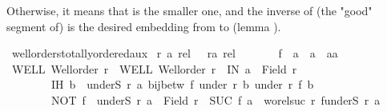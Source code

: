 \begin{isabellebody}
\begin{isamarkuptext}
   Otherwise, it means that  is the smaller one, and the inverse of
   (the "good" segment of)  is the desired embedding from  to 
   (lemma ).%
\end{isamarkuptext}\isamarkuptrue%
\isamarkupfalse%
\ wellorders{\isacharunderscore}{\kern0pt}totally{\isacharunderscore}{\kern0pt}ordered{\isacharunderscore}{\kern0pt}aux{\isacharcolon}{\kern0pt}\isanewline
{}\ r\ {\isacharcolon}{\kern0pt}{\isacharcolon}{\kern0pt}{\isachardoublequoteopen}{\isacharprime}{\kern0pt}a\ rel{\isachardoublequoteclose}\ \ \ r{\isacharprime}{\kern0pt}{\isacharcolon}{\kern0pt}{\isacharcolon}{\kern0pt}{\isachardoublequoteopen}{\isacharprime}{\kern0pt}a{\isacharprime}{\kern0pt}\ rel{\isachardoublequoteclose}\ \isanewline
\ \ \ \ \ \ f\ {\isacharcolon}{\kern0pt}{\isacharcolon}{\kern0pt}\ {\isachardoublequoteopen}{\isacharprime}{\kern0pt}a\ {\isasymRightarrow}\ {\isacharprime}{\kern0pt}a{\isacharprime}{\kern0pt}{\isachardoublequoteclose}\ \ a{\isacharcolon}{\kern0pt}{\isacharcolon}{\kern0pt}{\isacharprime}{\kern0pt}a\isanewline
{}\ WELL{\isacharcolon}{\kern0pt}\ {\isachardoublequoteopen}Well{\isacharunderscore}{\kern0pt}order\ r{\isachardoublequoteclose}\ \ WELL{\isacharprime}{\kern0pt}{\isacharcolon}{\kern0pt}\ {\isachardoublequoteopen}Well{\isacharunderscore}{\kern0pt}order\ r{\isacharprime}{\kern0pt}{\isachardoublequoteclose}\ \ IN{\isacharcolon}{\kern0pt}\ {\isachardoublequoteopen}a\ {\isasymin}\ Field\ r{\isachardoublequoteclose}\ \isanewline
\ \ \ \ \ \ \ \ IH{\isacharcolon}{\kern0pt}\ {\isachardoublequoteopen}{\isasymforall}b\ {\isasymin}\ underS\ r\ a{\isachardot}{\kern0pt}\ bij{\isacharunderscore}{\kern0pt}betw\ f\ {\isacharparenleft}{\kern0pt}under\ r\ b{\isacharparenright}{\kern0pt}\ {\isacharparenleft}{\kern0pt}under\ r{\isacharprime}{\kern0pt}\ {\isacharparenleft}{\kern0pt}f\ b{\isacharparenright}{\kern0pt}{\isacharparenright}{\kern0pt}{\isachardoublequoteclose}\ \isanewline
\ \ \ \ \ \ \ \ NOT{\isacharcolon}{\kern0pt}\ {\isachardoublequoteopen}f\ {\isacharbackquote}{\kern0pt}\ {\isacharparenleft}{\kern0pt}underS\ r\ a{\isacharparenright}{\kern0pt}\ {\isasymnoteq}\ Field\ r{\isacharprime}{\kern0pt}{\isachardoublequoteclose}\ \ SUC{\isacharcolon}{\kern0pt}\ {\isachardoublequoteopen}f\ a\ {\isacharequal}{\kern0pt}\ wo{\isacharunderscore}{\kern0pt}rel{\isachardot}{\kern0pt}suc\ r{\isacharprime}{\kern0pt}\ {\isacharparenleft}{\kern0pt}f{\isacharbackquote}{\kern0pt}{\isacharparenleft}{\kern0pt}underS\ r\ a{\isacharparenright}{\kern0pt}{\isacharparenright}{\kern0pt}{\isachardoublequoteclose}\isanewline

\end{isabellebody}
